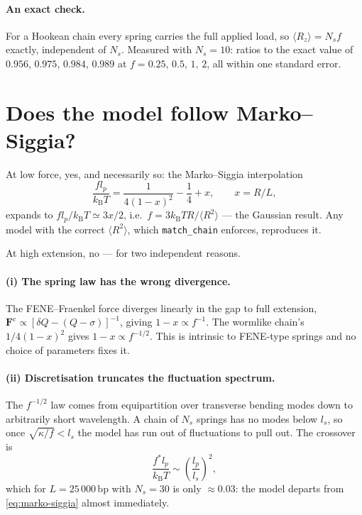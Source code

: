 \documentclass[11pt,a4paper]{report}
\newcommand{\kB}{k_\mathrm{B}}
\newcommand{\code}[1]{\texttt{\seqsplitcode{#1}}}
\newcommand{\seqsplitcode}[1]{#1}
\begin{document}
\paragraph{An exact check.} For a Hookean chain every spring carries the full
applied load, so $\langle R_z\rangle = N_s f$ exactly, independent of $N_s$.
Measured with $N_s = 10$: ratios to the exact value of $0.956$, $0.975$, $0.984$,
$0.989$ at $f = 0.25,\,0.5,\,1,\,2$, all within one standard error.

\section{Does the model follow Marko--Siggia?}
\label{sec:ms}

At low force, yes, and necessarily so: the Marko--Siggia interpolation
\begin{equation}
  \frac{f l_p}{\kB T} = \frac{1}{4(1-x)^{2}} - \frac{1}{4} + x,
  \qquad x = R/L,
  \label{eq:marko-siggia}
\end{equation}
expands to $f l_p/\kB T \simeq 3x/2$, i.e.\ $f = 3\kB T R/\langle
R^{2}\rangle$ --- the Gaussian result. Any model with the correct $\langle
R^{2}\rangle$, which \code{match\_chain} enforces, reproduces it.

At high extension, no --- for two independent reasons.

\paragraph{(i) The spring law has the wrong divergence.} The FENE--Fraenkel force
diverges linearly in the gap to full extension,
$\bm{F}^{\mathrm{c}}\propto\left[\delta Q - (Q-\sigma)\right]^{-1}$, giving
$1-x\propto f^{-1}$. The wormlike chain's $1/4(1-x)^{2}$ gives $1-x\propto
f^{-1/2}$. This is intrinsic to FENE-type springs and no choice of parameters
fixes it.

\paragraph{(ii) Discretisation truncates the fluctuation spectrum.} The
$f^{-1/2}$ law comes from equipartition over transverse bending modes down to
arbitrarily short wavelength. A chain of $N_s$ springs has no modes below $l_s$, so
once $\sqrt{\kappa/f} < l_s$ the model has run out of fluctuations to pull out. The
crossover is
\begin{equation}
  \frac{f^{*} l_p}{\kB T} \sim \left(\frac{l_p}{l_s}\right)^{2},
  \label{eq:fstar}
\end{equation}
which for $L = 25\,000$\,bp with $N_s = 30$ is only $\approx0.03$: the model
departs from \eqref{eq:marko-siggia} almost immediately.
\end{document}
